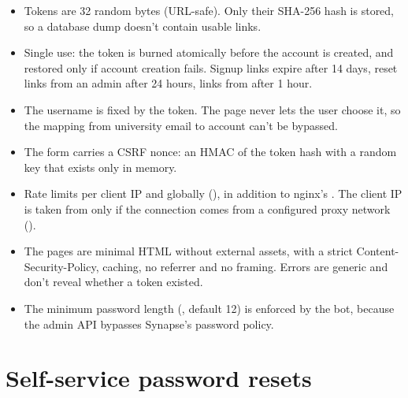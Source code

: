 \begin{itemize}
  \item Tokens are 32 random bytes (URL-safe). Only their SHA-256 hash is stored, so a
        database dump doesn't contain usable links.
  \item Single use: the token is burned atomically before the account is created, and
        restored only if account creation fails. Signup links expire after 14 days, reset
        links from an admin after 24 hours, links from  after 1 hour.
  \item The username is fixed by the token. The page never lets the user choose it, so the
        mapping from university email to account can't be bypassed.
  \item The form carries a CSRF nonce: an HMAC of the token hash with a random key that
        exists only in memory.
  \item Rate limits per client IP and globally (), in addition to
        nginx's . The client IP is taken from  only if the
        connection comes from a configured proxy network ().
  \item The pages are minimal HTML without external assets, with a strict
        Content-Security-Policy,  caching, no referrer and no framing. Errors
        are generic and don't reveal whether a token existed.
  \item The minimum password length (, default 12) is enforced
        by the bot, because the admin API bypasses Synapse's password policy.
\end{itemize}

\section{Self-service password resets}

